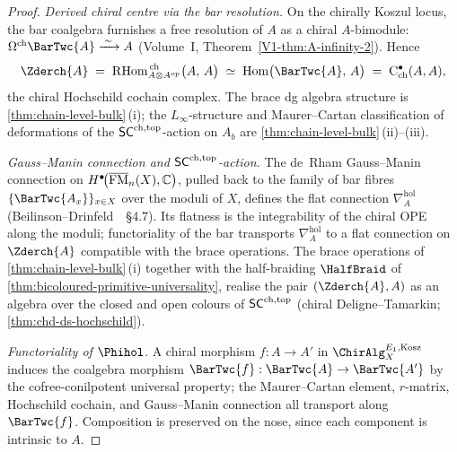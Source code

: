 \begin{proof}
\emph{Derived chiral centre via the bar resolution.}
On the chirally Koszul locus, the bar coalgebra furnishes a free
resolution of $A$ as a chiral $A$-bimodule:
$\Omega^{\mathrm{ch}}\BarTwc{A} \xrightarrow{\;\sim\;} A$
(Volume~I, Theorem~\ref*{V1-thm:A-infinity-2}).
Hence
\[
 \Zderch{A}
 \;=\; \mathrm{R}\mathrm{Hom}^{\,\mathrm{ch}}_{A \otimes A^{\mathrm{op}}}
 \bigl(A,\, A\bigr)
 \;\simeq\; \mathrm{Hom}\bigl(\BarTwc{A},\, A\bigr)
 \;=\; \mathrm{C}^{\bullet}_{\mathrm{ch}}(A, A),
\]
the chiral Hochschild cochain complex.  The brace dg algebra structure
is \cref{thm:chain-level-bulk}\,(i); the $L_{\infty}$-structure and
Maurer--Cartan classification of deformations of the $\mathsf{SC}^{\mathrm{ch},\mathrm{top}}$-action
on $A_{b}$ are \cref{thm:chain-level-bulk}\,(ii)--(iii).

\emph{Gauss--Manin connection and $\mathsf{SC}^{\mathrm{ch},\mathrm{top}}$-action.}
The de~Rham Gauss--Manin connection on
$H^{\bullet}\!\bigl(\overline{\mathrm{FM}}_{n}(X), \mathbb{C}\bigr)$,
pulled back to the family of bar fibres $\{\BarTwc{A_{x}}\}_{x \in X}$
over the moduli of $X$, defines the flat connection
$\nabla^{\mathrm{hol}}_{A}$
(Beilinson--Drinfeld~\cite{BD04}~\S 4.7).
Its flatness is the integrability of the chiral OPE along the moduli;
functoriality of the bar transports $\nabla^{\mathrm{hol}}_{A}$ to a
flat connection on $\Zderch{A}$ compatible with the brace operations.
The brace operations of \cref{thm:chain-level-bulk}\,(i) together
with the half-braiding $\HalfBraid$ of
\cref{thm:bicoloured-primitive-universality}, realise the
pair $(\Zderch{A}, A)$ as an algebra over the closed and open colours
of $\mathsf{SC}^{\mathrm{ch},\mathrm{top}}$ (chiral Deligne--Tamarkin;
\cref{thm:chd-ds-hochschild}).

\emph{Functoriality of $\Phihol$.}
A chiral morphism $f : A \to A'$ in
$\ChirAlg_{X}^{E_{1},\mathrm{Kosz}}$ induces the coalgebra morphism
$\BarTwc{f} : \BarTwc{A} \to \BarTwc{A'}$ by the cofree-conilpotent
universal property; the Maurer--Cartan element, $r$-matrix,
Hochschild cochain, and Gauss--Manin connection all transport along
$\BarTwc{f}$.  Composition is preserved on the nose, since each
component is intrinsic to $A$.
\end{proof}


